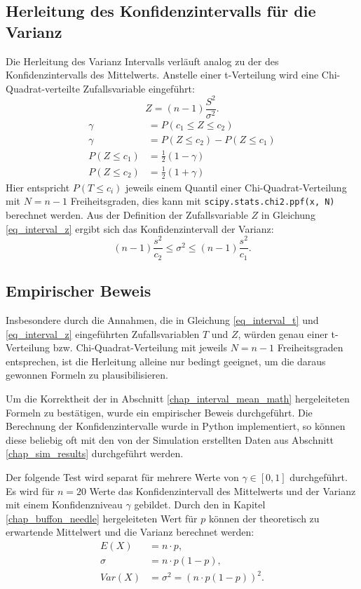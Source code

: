 \documentclass[10pt,twocolumn]{scrartcl}
\begin{document}
	\subsection{Herleitung des Konfidenzintervalls für die Varianz}
		\label{chap_interval_var_math}
		Die Herleitung des Varianz Intervalls verläuft analog zu der des Konfidenzintervalls des Mittelwerts. Anstelle einer t-Verteilung wird eine Chi-Quadrat-verteilte Zufallsvariable eingeführt:
		\begin{equation} \label{eq_interval_z}
		Z = (n-1)\frac{S^2}{\sigma^2} .
		\end{equation}
		\begin{align}
		\gamma &= P(c_1 \le Z \le c_2) \\
		\gamma &= P(Z \le c_2) - P(Z \le c_1) \nonumber \\
		P(Z \le c_1) &= \frac{1}{2} (1-\gamma) \\
		P(Z \le c_2) &= \frac{1}{2} (1+\gamma)
		\end{align}
		Hier entspricht $P(T \le c_i)$ jeweils einem Quantil einer Chi-Quadrat-Verteilung mit $N = n-1$ Freiheitsgraden, dies kann mit \texttt{scipy.stats.chi2.ppf(x, N)}\cite{scipy} berechnet werden.
		Aus der Definition der Zufallsvariable $Z$ in Gleichung \ref{eq_interval_z} ergibt sich das Konfidenzintervall der Varianz:
		\begin{equation}
		(n-1)  \frac{s^2}{c_2} \le \sigma^2 \le (n-1)  \frac{s^2}{c_1}.
		\end{equation}

	\subsection{Empirischer Beweis}
		\label{chap_interval_prove}
		Insbesondere durch die Annahmen, die in Gleichung \ref{eq_interval_t} und \ref{eq_interval_z} eingeführten  Zufallsvariablen $T$ und $Z$, würden genau einer t-Verteilung bzw. Chi-Quadrat-Verteilung mit jeweils $N = n-1$ Freiheitsgraden entsprechen, ist die Herleitung alleine nur bedingt geeignet, um die daraus gewonnen Formeln zu plausibilisieren.

		Um die Korrektheit der in Abschnitt \ref{chap_interval_mean_math} hergeleiteten Formeln zu bestätigen, wurde ein empirischer Beweis durchgeführt. Die Berechnung der Konfidenzintervalle wurde in Python implementiert, so können diese beliebig oft mit den von der Simulation erstellten Daten aus Abschnitt \ref{chap_sim_results} durchgeführt werden.

		Der folgende Test wird separat für mehrere Werte von $\gamma \in [0, 1]$ durchgeführt. Es wird für $n = 20$ Werte das Konfidenzintervall des Mittelwerts und der Varianz mit einem Konfidenzniveau $\gamma$ gebildet. Durch den in Kapitel \ref{chap_buffon_needle} hergeleiteten Wert für $p$ können der theoretisch zu erwartende Mittelwert und die Varianz berechnet werden:
		\begin{align}
		E(X) &= n \cdot p , \\
		\sigma &= n \cdot p (1-p) , \nonumber \\
		Var(X) &= \sigma^2 = (n \cdot p (1-p))^2 .
		\end{align}
\end{document}

